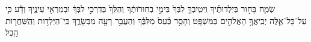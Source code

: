 \documentclass{openreader}
\begin{document}
שְׂמַ֧ח בָּח֣וּר בְּיַלְדוּתֶ֗יךָ וִֽיטִֽיבְךָ֤ לִבְּךָ֙ בִּימֵ֣י בְחוּרֹותֶ֔ךָ וְהַלֵּךְ֙ בְּדַרְכֵ֣י לִבְּךָ֔ וּבְמַרְאֵ֖י עֵינֶ֑יךָ וְדָ֕ע כִּ֧י עַל־כָּל־אֵ֛לֶּה יְבִֽיאֲךָ֥ הָאֱלֹהִ֖ים בַּמִּשְׁפָּֽט׃ 
וְהָסֵ֥ר כַּ֨עַס֙ מִלִּבֶּ֔ךָ וְהַעֲבֵ֥ר רָעָ֖ה מִבְּשָׂרֶ֑ךָ כִּֽי־הַיַּלְד֥וּת וְהַֽשַּׁחֲר֖וּת הָֽבֶל׃ 
\end{document}
